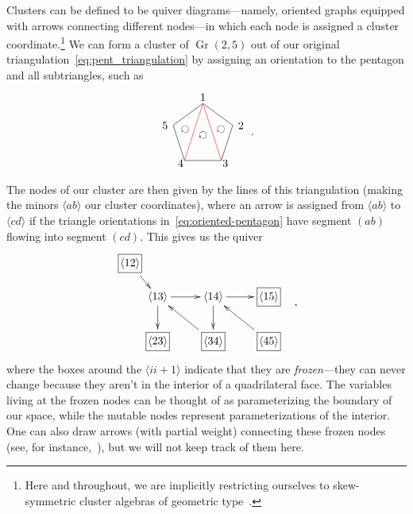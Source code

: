 \documentclass[11pt]{article}
\DeclareMathOperator{\Gr}{Gr}
\def\ket#1{\langle #1 \rangle}
\def\drawLabeledPentagon{
\coordinate (P1) at (90:1);
\coordinate (P2) at (18:1);
\coordinate (P3) at (306:1);
\coordinate (P4) at (234:1);
\coordinate (P5) at (162:1);
\draw (P1) -- (P2) -- (P3) -- (P4) -- (P5) -- cycle;
\draw (0,1.2) node {1};
\draw (1,.3) node[anchor=west] {2};
\draw (.5,-.9) node[anchor=west] {3};
\draw (-.5,-.9) node[anchor=east] {4};
\draw (-1,.3) node[anchor=east] {5};
}
\begin{document}
Clusters can be defined to be quiver diagrams---namely, oriented graphs equipped with arrows connecting different nodes---in which each node is assigned a cluster coordinate.\footnote{Here and throughout, we are implicitly restricting ourselves to skew-symmetric cluster algebras of geometric type~\cite{}.} We can form a cluster of $\Gr(2,5)$ out of our original triangulation~\eqref{eq:pent_triangulation} by assigning an orientation to the pentagon and all subtriangles, such as
\begin{equation}\label{eq:oriented-pentagon}
\begin{gathered}
\begin{tikzpicture}
  \drawLabeledPentagon
  \draw[color=red] (P1) -- (P3);
  \draw[color=red] (P1) -- (P4);
  \draw (18:.6) node[rotate=144] {$\circlearrowleft$};
  \draw (0:0) node[rotate=144] {$\circlearrowleft$};
  \draw (162:.6) node[rotate=144] {$\circlearrowleft$};
\end{tikzpicture} 
\end{gathered} \ .
\end{equation}
The nodes of our cluster are then given by the lines of this triangulation (making the minors $\ket{ab}$ our cluster coordinates), where an arrow is assigned from $\ket{ab}$ to $\ket{cd}$ if the triangle orientations in~\eqref{eq:oriented-pentagon} have segment $(ab)$ flowing into segment $(cd)$. This gives us the quiver
\begin{equation}\label{eq:gr25-seed}
\begin{gathered}
\begin{xy} 0;<1pt,0pt>:<0pt,-1pt>::
	(25,30) *+{\langle 13\rangle} ="0",
	(75,30) *+{\langle 14\rangle} ="1",
	(125,30) *+{\framebox[5ex]{$\langle 15\rangle$}} ="2",
	(125,70) *+{\framebox[5ex]{$\langle 45\rangle$}} ="3",
	(75,70) *+{\framebox[5ex]{$\langle 34\rangle$}} ="4",
	(25,70) *+{\framebox[5ex]{$\langle 23\rangle$}} ="5",
	(0,0) *+{\framebox[5ex]{$\langle 12\rangle$}} ="6",
	(145,75) *+{},
	"0", {\ar"1"},
	"4", {\ar"0"},
	"0", {\ar"5"},
	"6", {\ar"0"},
	"1", {\ar"2"},
	"3", {\ar"1"},
	"1", {\ar"4"},
\end{xy}
\end{gathered} ,
\end{equation}
where the boxes around the $\ket{ii+1}$ indicate that they are \emph{frozen}---they can never change because they aren't in the interior of a quadrilateral face. The variables living at the frozen nodes can be thought of as parameterizing the boundary of our space, while the mutable nodes represent parameterizations of the interior. One can also draw arrows (with partial weight) connecting these frozen nodes (see, for instance,~\cite{ArkaniHamed:2012nw}), but we will not keep track of them here. 
\end{document}
